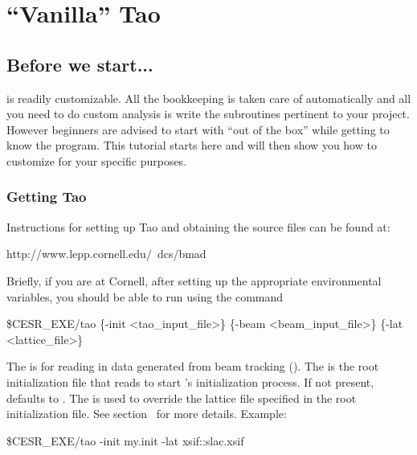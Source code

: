 

\chapter{``Vanilla'' Tao}
\label{c:vanilla_tao}

\section{Before we start...}
\label{s:before_beginning}

\tao is readily customizable. All the bookkeeping is taken care of
automatically and all you need to do custom analysis is write the
subroutines pertinent to your project. However beginners are advised
to start with ``out of the box'' \tao while getting to know the
program. This tutorial starts here and will then show you how to
customize \tao for your specific purposes.

\subsection{Getting Tao}
\label{s:get_and_compile}

Instructions for setting up Tao and obtaining the source files can be
found at:
\begin{example}
  http://www.lepp.cornell.edu/~dcs/bmad
\end{example}

Briefly, if you are at Cornell, after setting up the appropriate
environmental variables, you should be able to run \tao using the
command
\begin{example}
  \$CESR_EXE/tao \{-init <tao_input_file>\} \{-beam <beam_input_file>\} \{-lat <lattice_file>\}
\end{example}
The  is for reading in data generated from beam
tracking (). The  is the
root initialization file that \tao reads to start \tao's
initialization process. If not present,  defaults
to . The  is used to override the
lattice file specified in the root initialization file. See
section~ for more details. Example:
\begin{example}
  \$CESR_EXE/tao -init my.init -lat xsif::slac.xsif
\end{example}

